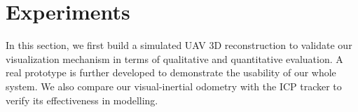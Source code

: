 \documentclass[journal]{IEEEtran}
\begin{document}













\section{Experiments}


In this section, we first build a simulated UAV 3D reconstruction to validate our 
visualization mechanism in terms of qualitative and quantitative evaluation.
A real prototype is further developed to demonstrate the usability of our whole system.
We also compare our visual-inertial odometry with the ICP tracker to verify its effectiveness
in modelling.
\end{document}
